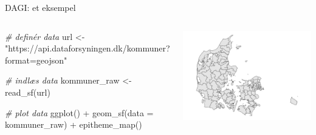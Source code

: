 \documentclass[
  8pt,
  ignorenonframetext,
  aspectratio=169]{beamer}
\newenvironment{Shaded}{}{}
\newcommand{\AttributeTok}[1]{\textcolor[rgb]{0.49,0.56,0.16}{#1}}
\newcommand{\CommentTok}[1]{\textcolor[rgb]{0.38,0.63,0.69}{\textit{#1}}}
\newcommand{\FunctionTok}[1]{\textcolor[rgb]{0.02,0.16,0.49}{#1}}
\newcommand{\NormalTok}[1]{#1}
\newcommand{\OtherTok}[1]{\textcolor[rgb]{0.00,0.44,0.13}{#1}}
\newcommand{\SpecialCharTok}[1]{\textcolor[rgb]{0.25,0.44,0.63}{#1}}
\newcommand{\StringTok}[1]{\textcolor[rgb]{0.25,0.44,0.63}{#1}}
\newcommand{\columnsbegin}{\begin{columns}}
\newcommand{\columnsend}{\end{columns}}
\begin{document}
\begin{frame}[fragile]{DAGI: et eksempel}
\protect\hypertarget{dagi-et-eksempel}{}
\columnsbegin
{}

\tiny

\begin{Shaded}
\begin{Highlighting}[]
\CommentTok{\# definér data}
\NormalTok{url }\OtherTok{\textless{}{-}} 
  \StringTok{"https://api.dataforsyningen.dk/kommuner?format=geojson"}

\CommentTok{\# indlæs data}
\NormalTok{kommuner\_raw }\OtherTok{\textless{}{-}} 
  \FunctionTok{read\_sf}\NormalTok{(url)}

\CommentTok{\# plot data}
\FunctionTok{ggplot}\NormalTok{() }\SpecialCharTok{+}
  \FunctionTok{geom\_sf}\NormalTok{(}\AttributeTok{data =}\NormalTok{ kommuner\_raw) }\SpecialCharTok{+}
  \FunctionTok{epitheme\_map}\NormalTok{()}
\end{Highlighting}
\end{Shaded}

\normalsize {}

\tiny

\includegraphics{crashcourse_slides_files/figure-beamer/unnamed-chunk-7-1.pdf}

\normalsize \columnsend
\end{frame}
\end{document}
